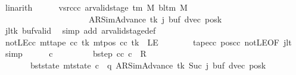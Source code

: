 \begin{isabellebody}
\ linarith\isanewline
\ \ \ \ \isamarkupfalse%
\ vsrc{\isacharunderscore}{\kern0pt}cc{\isacharcolon}{\kern0pt}\ {\isachardoublequoteopen}ar{\isacharunderscore}{\kern0pt}valid{\isacharunderscore}{\kern0pt}stage\ {\isacharparenleft}{\kern0pt}{\isasymGamma}{\isacharunderscore}{\kern0pt}tm\ M{\isacharparenright}{\kern0pt}\ {\isacharparenleft}{\kern0pt}bl{\isacharunderscore}{\kern0pt}tm\ M{\isacharparenright}{\kern0pt}\isanewline
\ \ \ \ \ \ \ \ \ \ \ \ \ \ \ \ \ \ \ \ \ {\isacharparenleft}{\kern0pt}AR{\isacharunderscore}{\kern0pt}SimAdvance{\isacharcomma}{\kern0pt}\ tk{\isacharcomma}{\kern0pt}\ j{\isacharcomma}{\kern0pt}\ buf{\isacharcomma}{\kern0pt}\ dvec{\isacharcomma}{\kern0pt}\ posk{\isacharparenright}{\kern0pt}{\isachardoublequoteclose}\isanewline
\ \ \ \ \ \ \isamarkupfalse%
\ j{\isacharunderscore}{\kern0pt}lt{}k\ buf{\isacharunderscore}{\kern0pt}valid\ \isamarkupfalse%
\ {\isacharparenleft}{\kern0pt}simp\ add{\isacharcolon}{\kern0pt}\ ar{\isacharunderscore}{\kern0pt}valid{\isacharunderscore}{\kern0pt}stage{\isacharunderscore}{\kern0pt}def{\isacharparenright}{\kern0pt}\isanewline
\ \ \ \ \isamarkupfalse%
\ notLE{\isacharunderscore}{\kern0pt}cc{\isacharcolon}{\kern0pt}\ {\isachardoublequoteopen}mt{\isacharunderscore}{\kern0pt}tape\ cc\ tk\ {\isacharparenleft}{\kern0pt}mt{\isacharunderscore}{\kern0pt}pos\ cc\ tk{\isacharparenright}{\kern0pt}\ {\isasymnoteq}\ LE{}{\isachardoublequoteclose}\isanewline
\ \ \ \ \ \ \isamarkupfalse%
\ tape{\isacharunderscore}{\kern0pt}cc\ pos{\isacharunderscore}{\kern0pt}cc\ notLE{\isacharbrackleft}{\kern0pt}OF\ jlt{\isacharbrackright}{\kern0pt}\ \isamarkupfalse%
\ simp\isanewline
\ \ \ \ \isamarkupfalse%
\ c{\isacharprime}{\kern0pt}{\isacharprime}{\kern0pt}\ \isanewline
\ \ \ \ \ \ \ \ bstep{\isacharcolon}{\kern0pt}\ {\isachardoublequoteopen}{\isacharparenleft}{\kern0pt}cc{\isacharcomma}{\kern0pt}\ c{\isacharprime}{\kern0pt}{\isacharprime}{\kern0pt}{\isacharparenright}{\kern0pt}\ {\isasymin}\ R{\isacharprime}{\kern0pt}{\isachardoublequoteclose}\isanewline
\ \ \ \ \ \ \ bst{\isacharunderscore}{\kern0pt}state{\isacharcolon}{\kern0pt}\ {\isachardoublequoteopen}mt{\isacharunderscore}{\kern0pt}state\ c{\isacharprime}{\kern0pt}{\isacharprime}{\kern0pt}\ {\isacharequal}{\kern0pt}\ {\isacharparenleft}{\kern0pt}q{\isacharcomma}{\kern0pt}\ AR{\isacharunderscore}{\kern0pt}SimAdvance{\isacharcomma}{\kern0pt}\ tk{\isacharcomma}{\kern0pt}\ Suc\ j{\isacharcomma}{\kern0pt}\ buf{\isacharcomma}{\kern0pt}\ dvec{\isacharcomma}{\kern0pt}\ posk{\isacharparenright}{\kern0pt}{\isachardoublequoteclose}\isanewline

\end{isabellebody}
